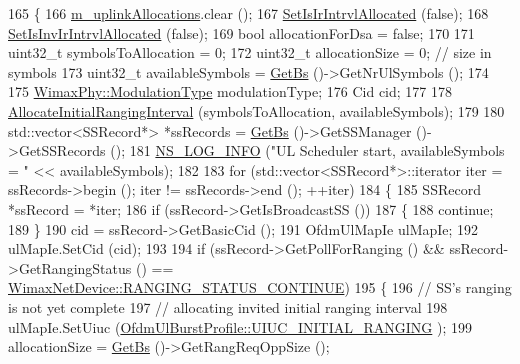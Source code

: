 \begin{DoxyCode}
165 \{
166   \hyperlink{classns3_1_1UplinkSchedulerRtps_a4cb3da7f31082b64a21b7f9adc7fd2e4}{m\_uplinkAllocations}.clear ();
167   \hyperlink{classns3_1_1UplinkScheduler_a3eee0d06486678eab4d352a274676d95}{SetIsIrIntrvlAllocated} (\textcolor{keyword}{false});
168   \hyperlink{classns3_1_1UplinkScheduler_a766e3b6c032052002929eb351934e42b}{SetIsInvIrIntrvlAllocated} (\textcolor{keyword}{false});
169   \textcolor{keywordtype}{bool} allocationForDsa = \textcolor{keyword}{false};
170 
171   uint32\_t symbolsToAllocation = 0;
172   uint32\_t allocationSize = 0; \textcolor{comment}{// size in symbols}
173   uint32\_t availableSymbols = \hyperlink{classns3_1_1UplinkScheduler_afe61b7de71d92d2dff1b135744a6ff7e}{GetBs} ()->GetNrUlSymbols ();
174 
175   \hyperlink{classns3_1_1WimaxPhy_a044c5d8a48ca992c39c2a946f6e755fa}{WimaxPhy::ModulationType} modulationType;
176   Cid cid;
177 
178   \hyperlink{classns3_1_1UplinkSchedulerRtps_adc340ccabe8e7dcaec455bdfd111d632}{AllocateInitialRangingInterval} (symbolsToAllocation, availableSymbols);
179 
180   std::vector<SSRecord*> *ssRecords = \hyperlink{classns3_1_1UplinkScheduler_afe61b7de71d92d2dff1b135744a6ff7e}{GetBs} ()->GetSSManager ()->GetSSRecords ();
181   \hyperlink{group__logging_gafbd73ee2cf9f26b319f49086d8e860fb}{NS\_LOG\_INFO} (\textcolor{stringliteral}{"UL Scheduler start, availableSymbols = "} << availableSymbols);
182 
183   \textcolor{keywordflow}{for} (std::vector<SSRecord*>::iterator iter = ssRecords->begin (); iter != ssRecords->end (); ++iter)
184     \{
185       SSRecord *ssRecord = *iter;
186       \textcolor{keywordflow}{if} (ssRecord->GetIsBroadcastSS ())
187         \{
188           \textcolor{keywordflow}{continue};
189         \}
190       cid = ssRecord->GetBasicCid ();
191       OfdmUlMapIe ulMapIe;
192       ulMapIe.SetCid (cid);
193 
194       \textcolor{keywordflow}{if} (ssRecord->GetPollForRanging () && ssRecord->GetRangingStatus () == 
      \hyperlink{classns3_1_1WimaxNetDevice_a2a74c0f01e51abc1851a630242e7b591ace0a03105b6d7cf2c6ec79e9789dc3a6}{WimaxNetDevice::RANGING\_STATUS\_CONTINUE})
195         \{
196           \textcolor{comment}{// SS's ranging is not yet complete}
197           \textcolor{comment}{// allocating invited initial ranging interval}
198           ulMapIe.SetUiuc (\hyperlink{classns3_1_1OfdmUlBurstProfile_ae528783c4b3c6700ff49dfd7a555cb3daaea7b6256d4bcd0125f0248c0560c94e}{OfdmUlBurstProfile::UIUC\_INITIAL\_RANGING}
      );
199           allocationSize = \hyperlink{classns3_1_1UplinkScheduler_afe61b7de71d92d2dff1b135744a6ff7e}{GetBs} ()->GetRangReqOppSize ();

\end{DoxyCode}
